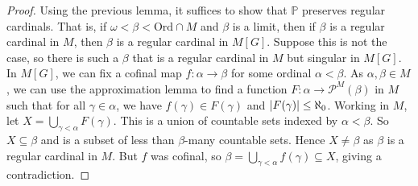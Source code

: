 \begin{proof}
    Using the previous lemma, it suffices to show that \( \mathbb P \) preserves regular cardinals.
    That is, if \( \omega < \beta < \mathrm{Ord} \cap M \) and \( \beta \) is a limit, then if \( \beta \) is a regular cardinal in \( M \), then \( \beta \) is a regular cardinal in \( M[G] \).
    Suppose this is not the case, so there is such a \( \beta \) that is a regular cardinal in \( M \) but singular in \( M[G] \).
    In \( M[G] \), we can fix a cofinal map \( f : \alpha \to \beta \) for some ordinal \( \alpha < \beta \).
    As \( \alpha, \beta \in M \), we can use the approximation lemma to find a function \( F : \alpha \to \mathcal P^M(\beta) \) in \( M \) such that for all \( \gamma \in \alpha \), we have \( f(\gamma) \in F(\gamma) \) and \( \abs{F(\gamma)} \leq \aleph_0 \).
    Working in \( M \), let \( X = \bigcup_{\gamma < \alpha} F(\gamma) \).
    This is a union of countable sets indexed by \( \alpha < \beta \).
    So \( X \subseteq \beta \) and is a subset of less than \( \beta \)-many countable sets.
    Hence \( X \neq \beta \) as \( \beta \) is a regular cardinal in \( M \).
    But \( f \) was cofinal, so \( \beta = \bigcup_{\gamma < \alpha} f(\gamma) \subseteq X \), giving a contradiction.
\end{proof}

